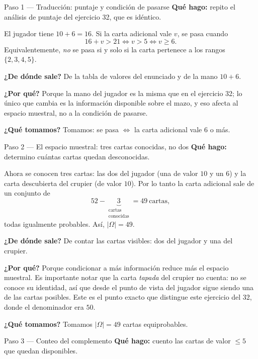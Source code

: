 \documentclass[11pt]{article}
\begin{document}
\begin{sol}

\begin{paso}{Paso 1 --- Traducci\'on: puntaje y condici\'on de pasarse}
\textbf{Qu\'e hago:} repito el an\'alisis de puntaje del ejercicio 32, que es id\'entico.

El jugador tiene $10+6=16$. Si la carta adicional vale $v$, se pasa cuando
\[
16+v>21\iff v>5\iff v\ge 6 .
\]
Equivalentemente, \emph{no} se pasa si y solo si la carta pertenece a los rangos $\{2,3,4,5\}$.

\textbf{¿De d\'onde sale?} De la tabla de valores del enunciado y de la mano $10+6$.

\textbf{¿Por qu\'e?} Porque la mano del jugador es la misma que en el ejercicio 32; lo \'unico que cambia es la informaci\'on disponible sobre el mazo, y eso afecta al espacio muestral, no a la condici\'on de pasarse.

\textbf{¿Qu\'e tomamos?} Tomamos: se pasa $\iff$ la carta adicional vale $6$ o m\'as.
\end{paso}

\begin{paso}{Paso 2 --- El espacio muestral: tres cartas conocidas, no dos}
\textbf{Qu\'e hago:} determino cu\'antas cartas quedan desconocidas.

Ahora se conocen tres cartas: las dos del jugador (una de valor $10$ y un $6$) y la carta descubierta del crupier (de valor $10$). Por lo tanto la carta adicional sale de un conjunto de
\[
52-\underbrace{3}_{\substack{\text{cartas}\\ \text{conocidas}}}=49 \ \text{cartas},
\]
todas igualmente probables. As\'i, $|\Omega|=49$.

\textbf{¿De d\'onde sale?} De contar las cartas visibles: dos del jugador y una del crupier.

\textbf{¿Por qu\'e?} Porque condicionar a m\'as informaci\'on reduce m\'as el espacio muestral. Es importante notar que la carta \emph{tapada} del crupier no cuenta: no se conoce su identidad, as\'i que desde el punto de vista del jugador sigue siendo una de las cartas posibles. Este es el punto exacto que distingue este ejercicio del 32, donde el denominador era $50$.

\textbf{¿Qu\'e tomamos?} Tomamos $|\Omega|=49$ cartas equiprobables.
\end{paso}

\begin{paso}{Paso 3 --- Conteo del complemento}
\textbf{Qu\'e hago:} cuento las cartas de valor $\le 5$ que quedan disponibles.


\end{paso}
\end{sol}
\end{document}
